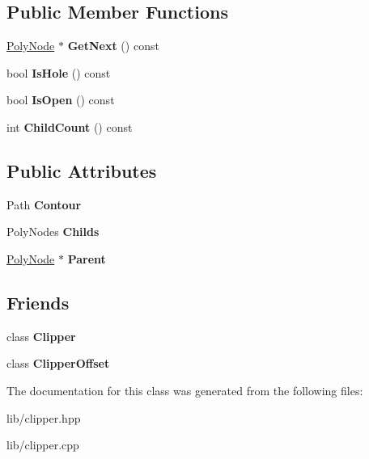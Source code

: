 \subsection*{Public Member Functions}
\begin{DoxyCompactItemize}
\item 
\mbox{\label{class_clipper_lib_1_1_poly_node_adbcb861001d8bfbd609c4ba4f4a19a58}} 
\hyperlink{class_clipper_lib_1_1_poly_node}{Poly\+Node} $\ast$ {\bfseries Get\+Next} () const
\item 
\mbox{\label{class_clipper_lib_1_1_poly_node_a0467801cae1b28ad8a4917b96e551536}} 
bool {\bfseries Is\+Hole} () const
\item 
\mbox{\label{class_clipper_lib_1_1_poly_node_ac9ade640af2515976d337b65e8e84776}} 
bool {\bfseries Is\+Open} () const
\item 
\mbox{\label{class_clipper_lib_1_1_poly_node_a19128db6fb2aca66555231edaffa7ade}} 
int {\bfseries Child\+Count} () const
\end{DoxyCompactItemize}
\subsection*{Public Attributes}
\begin{DoxyCompactItemize}
\item 
\mbox{\label{class_clipper_lib_1_1_poly_node_a1d08b8a9499ff8cb89d5d63a12f881ea}} 
Path {\bfseries Contour}
\item 
\mbox{\label{class_clipper_lib_1_1_poly_node_a7ac59aea508951a4c979bfca8913261d}} 
Poly\+Nodes {\bfseries Childs}
\item 
\mbox{\label{class_clipper_lib_1_1_poly_node_a9465bc02623316de2af3ab52c6f7041e}} 
\hyperlink{class_clipper_lib_1_1_poly_node}{Poly\+Node} $\ast$ {\bfseries Parent}
\end{DoxyCompactItemize}
\subsection*{Friends}
\begin{DoxyCompactItemize}
\item 
\mbox{\label{class_clipper_lib_1_1_poly_node_a4d39a09ecdddeeb85930dd4554a54b3c}} 
class {\bfseries Clipper}
\item 
\mbox{\label{class_clipper_lib_1_1_poly_node_adadfb8ac9a17a5c8fb7b4f012075b975}} 
class {\bfseries Clipper\+Offset}
\end{DoxyCompactItemize}


The documentation for this class was generated from the following files\+:\begin{DoxyCompactItemize}
\item 
lib/clipper.\+hpp\item 
lib/clipper.\+cpp\end{DoxyCompactItemize}
